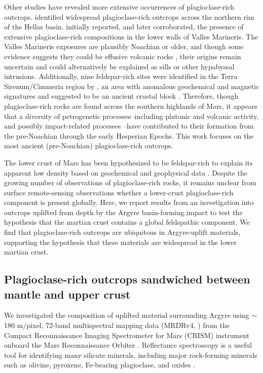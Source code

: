 \documentclass[12pt]{article}
\begin{document}
Other studies have revealed more extensive occurrences of plagioclase-rich outcrops. \citet{Phillips2022} identified widespread plagioclase-rich outcrops across the northern rim of the Hellas basin. \citet{Viviano-Beck2017} initially reported, and \citet{Flahaut2023} later corroborated, the presence of extensive plagioclase-rich compositions in the lower walls of Valles Marineris. The Valles Marineris exposures are plausibly Noachian or older, and though some evidence suggests they could be effusive volcanic rocks \citep{Flahaut2023}, their origins remain uncertain and could alternatively be explained as sills or other hypabyssal intrusions. Additionally, nine feldspar-rich sites were identified in the Terra Sirenum/Cimmeria region by \citet{Payre2022}, an area with anomalous geochemical and magnetic signatures and suggested to be an ancient crustal block \citep{Bouley2020}. Therefore, though plagioclase-rich rocks are found across the southern highlands of Mars, it appears that a diversity of petrogenetic processes--including plutonic and volcanic activity, and possibly impact-related processes \citep{Grieve1991, Hurwitz2014, Vaughan2014, Koeppel2020}--have contributed to their formation from the pre-Noachian through the early Hesperian Epochs. This work focuses on the most ancient (pre-Noachian) plagioclase-rich outcrops.

The lower crust of Mars has been hypothesized to be feldspar-rich to explain its apparent low density based on geochemical and geophysical data \citep{Baratoux2014, Goossens2017, Knapmeyer-Endrun2021}. Despite the growing number of observations of plagioclase-rich rocks, it remains unclear from surface remote-sensing observations whether a lower-crust plagioclase-rich component is present globally. Here, we report results from an investigation into outcrops uplifted from depth by the Argyre basin-forming impact to test the hypothesis that the martian crust contains a global feldspathic component. We find that plagioclase-rich outcrops are ubiquitous in Argyre-uplift materials, supporting the hypothesis that these materials are widespread in the lower martian crust.

\subsection*{Plagioclase-rich outcrops sandwiched between mantle and upper crust}

We investigated the composition of uplifted material surrounding Argyre using $\sim$180 m/pixel, 72-band multispectral mapping data (MRDRv4, \citealt{Seelos2023}) from the Compact Reconnaissance Imaging Spectrometer for Mars (CRISM) instrument onboard the Mars Reconnaissance Orbiter \citep{Murchie2007}. Reflectance spectroscopy is a useful tool for identifying many silicate minerals, including major rock-forming minerals such as olivine, pyroxene, Fe-bearing plagioclase, and oxides \citep{Adams1967, Adams1968, Clark1984}.
\end{document}
